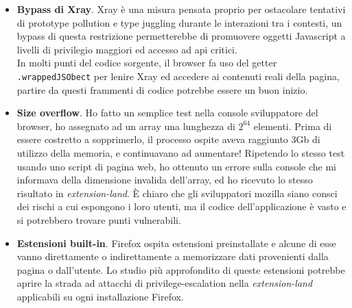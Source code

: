 \documentclass{sapthesis}
\newcommand{\bold}[1]{\textbf{#1}}
\newcommand{\code}[1]{\texttt{#1}}
\newcommand{\attr}[1]{\code{.#1}}
\newcommand{\JS}{Javascript}
\begin{document}
\begin{itemize}
            \item \bold{Bypass di Xray}. Xray è una misura pensata proprio per ostacolare tentativi di
                    prototype pollution e type juggling durante le interazioni tra i contesti, un bypass di
                    questa restrizione permetterebbe di promuovere oggetti \JS{} a livelli di privilegio
                    maggiori ed accesso ad api critici.\\
                    In molti punti del codice sorgente, il browser fa uso del getter \attr{wrappedJSObect} per
                    lenire Xray ed accedere ai contenuti reali della pagina, partire da questi frammenti di
                    codice potrebbe essere un buon inizio.

            \item \bold{Size overflow}. Ho fatto un semplice test nella console sviluppatore del browser, ho
                    assegnato ad un array una lunghezza di $2^{64}$ elementi. Prima di essere costretto a sopprimerlo,
                    il processo ospite aveva raggiunto 3Gb di utilizzo della memoria, e continuavano ad aumentare!
                    Ripetendo lo stesso test usando uno script di pagina web, ho ottenuto un errore sulla console
                    che mi informava della dimensione invalida dell'array, ed ho ricevuto lo stesso risultato
                    in \textit{extension-land}. È chiaro che gli sviluppatori mozilla siano consci dei rischi a cui
                    espongono i loro utenti, ma il codice dell'applicazione è vasto e si potrebbero trovare punti
                    vulnerabili.

            \item \bold{Estensioni built-in}. Firefox ospita estensioni preinstallate e alcune di esse vanno
                    direttamente o indirettamente a memorizzare dati provenienti dalla pagina o dall'utente.
                    Lo studio più approfondito di queste estensioni potrebbe aprire la strada ad attacchi di 
                    privilege-escalation nella \textit{extension-land} applicabili su ogni installazione Firefox.
        \end{itemize}

\printbibliography
\end{document}
